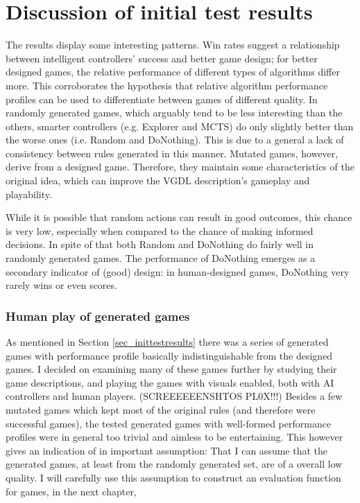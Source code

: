 \documentclass[a4paper,titlepage,final]{report}
\begin{document}
\section{Discussion of initial test results}
\label{sec_task1discussion}
The results display some interesting patterns. Win rates suggest a relationship between intelligent controllers' success and better game design; for better designed games, the relative performance of different types of algorithms differ more. This corroborates the hypothesis that relative algorithm performance profiles can be used to differentiate between games of different quality. In randomly generated games, which arguably tend to be less interesting than the others, smarter controllers (e.g. Explorer and MCTS) do only slightly better than the worse ones (i.e. Random and DoNothing). This is due to a general a lack of consistency between rules generated in this manner. Mutated games, however, derive from a designed game. Therefore, they maintain some characteristics of the original idea, which can improve the VGDL description's gameplay and playability. %

While it is possible that random actions can result in good outcomes, this chance is very low, especially when compared to the chance of making informed decisions. In spite of that both Random and DoNothing do fairly well in randomly generated games. The performance of DoNothing emerges as a secondary indicator of (good) design: in human-designed games, DoNothing very rarely wins or even scores.

\subsubsection*{Human play of generated games}
As mentioned in Section \ref{sec_inittestresults} there was a series of generated games with performance profile basically indistinguishable from the designed games.
I decided on examining many of these games further by studying their game descriptions, and playing the games with visuals enabled, both with AI controllers and human players. (SCREEEEEENSHTOS PL0X!!!)
Besides a few mutated games which kept most of the original rules (and therefore were successful games), the tested generated games with well-formed performance profiles were in general too trivial and aimless to be entertaining.
This however gives an indication of in important assumption: That I can assume that the generated games, at least from the randomly generated set, are of a overall low quality.
I will carefully use this assumption to construct an evaluation function for games, in the next chapter,
\end{document}
